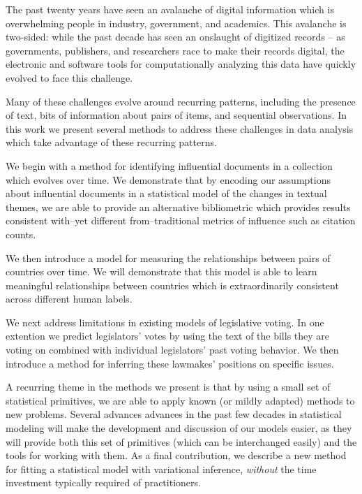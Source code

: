The past twenty years have seen an avalanche of digital information which is overwhelming people in industry, government, and academics.  This avalanche is two-sided: while the past decade has seen an onslaught of digitized records -- as governments, publishers, and researchers race to make their records digital, the electronic and software tools for computationally analyzing this data have quickly evolved to face this challenge.

Many of these challenges evolve around recurring patterns, including the presence of text, bits of information about pairs of items, and sequential observations.  In this work we present several methods to address these challenges in data analysis which take advantage of these recurring patterns.

We begin with a method for identifying influential documents in a collection which evolves over time.  We demonstrate that by encoding our assumptions about influential documents in a statistical model of the changes in textual themes, we are able to provide an alternative bibliometric which provides results consistent with--yet different from--traditional metrics of influence such as citation counts.

We then introduce a model for measuring the relationships between pairs of countries over time.  We will demonstrate that this model is able to learn meaningful relationships between countries which is extraordinarily consistent across different human labels.

We next address limitations in existing models of legislative voting.  In one extention we predict legislators' votes by using the text of the bills they are voting on combined with individual legislators' past voting behavior.  We then introduce a method for inferring these lawmakes' positions on specific issues.

A recurring theme in the methods we present is that by using a small set of statistical primitives, we are able to apply known (or mildly adapted) methods to new problems.  Several advances advances in the past few decades in statistical modeling will make the development and discussion of our models easier, as they will provide both this set of primitives (which can be interchanged easily) and the tools for working with them.  As a final contribution, we describe a new method for fitting a statistical model with variational inference, \emph{without} the time investment typically required of practitioners.

